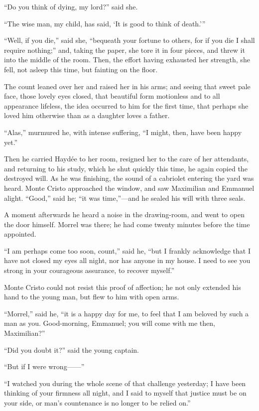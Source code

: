 “Do you think of dying, my lord?” said she.

“The wise man, my child, has said, ‘It is good to think of death.’”

“Well, if you die,” said she, “bequeath your fortune to others, for if
you die I shall require nothing;” and, taking the paper, she tore it in
four pieces, and threw it into the middle of the room. Then, the effort
having exhausted her strength, she fell, not asleep this time, but
fainting on the floor.

The count leaned over her and raised her in his arms; and seeing that
sweet pale face, those lovely eyes closed, that beautiful form
motionless and to all appearance lifeless, the idea occurred to him for
the first time, that perhaps she loved him otherwise than as a daughter
loves a father.

“Alas,” murmured he, with intense suffering, “I might, then, have been
happy yet.”

Then he carried Haydée to her room, resigned her to the care of her
attendants, and returning to his study, which he shut quickly this
time, he again copied the destroyed will. As he was finishing, the
sound of a cabriolet entering the yard was heard. Monte Cristo
approached the window, and saw Maximilian and Emmanuel alight. “Good,”
said he; “it was time,”—and he sealed his will with three seals.

A moment afterwards he heard a noise in the drawing-room, and went to
open the door himself. Morrel was there; he had come twenty minutes
before the time appointed.

“I am perhaps come too soon, count,” said he, “but I frankly
acknowledge that I have not closed my eyes all night, nor has anyone in
my house. I need to see you strong in your courageous assurance, to
recover myself.”

Monte Cristo could not resist this proof of affection; he not only
extended his hand to the young man, but flew to him with open arms.

“Morrel,” said he, “it is a happy day for me, to feel that I am beloved
by such a man as you. Good-morning, Emmanuel; you will come with me
then, Maximilian?”

“Did you doubt it?” said the young captain.

“But if I were wrong——”

“I watched you during the whole scene of that challenge yesterday; I
have been thinking of your firmness all night, and I said to myself
that justice must be on your side, or man’s countenance is no longer to
be relied on.”

